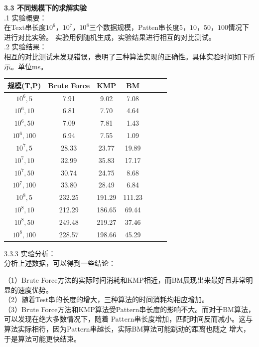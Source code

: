 \documentclass[a4paper]{article}
\begin{document}
\begin{enumerate}
  \medskip
  \textbf{3.3 不同规模下的求解实验}\\
  .1 实验概要：\\
  在Text串长度$10^6$，$10^7$，$10^8$三个数据规模，Patten串长度$5$，$10$，$50$，$100$情况下进行对比实验。
  实验用例随机生成，实验结果进行相互的对比测试。\\
  .2 实验结果：\\
  相互的对比测试未发现错误，表明了三种算法实现的正确性。具体实验时间如下所示。单位ms。
    \begin{center}
      \begin{tabular}{c|cccccc}\hline\hline
        规模(T,P)      &Brute Force  &KMP        &BM       \\\hline
        $10^6,5$      &7.91         &9.02       &7.08   \\
        $10^6,10$     &6.81         &7.70       &4.64   \\
        $10^6,50$     &7.09         &7.81       &1.43   \\
        $10^6,100$    &6.94         &7.55       &1.09  \\
        $10^7,5$      &28.33        &23.77      &19.89     \\
        $10^7,10$     &32.99        &35.83      &17.17   \\
        $10^7,50$     &30.74        &24.75      &8.68   \\
        $10^7,100$    &33.80        &28.49      &6.84   \\
        $10^8,5$      &232.25       &191.29     &111.23   \\
        $10^8,10$     &212.29       &186.65     &69.44   \\
        $10^8,50$     &249.48       &219.27     &37.46   \\
        $10^8,100$    &228.57       &198.66     &45.29   \\
        \hline\hline
      \end{tabular}
    \end{center}


  \medskip

  3.3.3 实验分析：\\
  分析上述数据，可以得到一些结论：

  （1）Brute Force方法的实际时间消耗和KMP相近，而BM展现出来最好且非常明显的速度优势。\\
  （2）随着Test串的长度的增大，三种算法的时间消耗均相应增加。\\
  （3）Brute Force方法和KMP算法受Pattern串长度的影响不大。而对于BM算法，可以发现在绝大多数情况下，随着
  Pattern串长度增加，匹配时间反而减小。这与算法实际相符，因为Pattern串越长，实际BM算法可能跳动的距离也随之
  增大，于是算法可能更快结束。


\end{enumerate}
\end{document}
